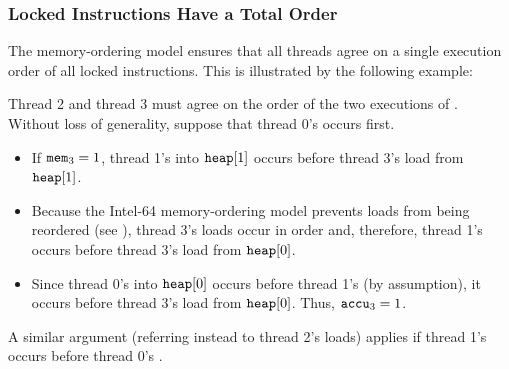 \newpage

\subsubsection*{Locked Instructions Have a Total Order}

The memory-ordering model ensures that all threads agree on a single execution order of all locked instructions.
This is illustrated by the following example:

\begin{table}[!hbt]
\noindent{}
\caption{Locked Instructions Have a Total Order \cite[Example 8-8]{ref:Intel}}
\label{tbl:litmus:intel:8}
\end{table}

\noindent
Thread 2 and thread 3 must agree on the order of the two executions of .
Without loss of generality, suppose that thread 0’s  occurs first.
\begin{itemize}
  \item If $\texttt{mem}_3 = 1$, thread 1’s  into $\texttt{heap}[1]$ occurs before thread 3’s load from $\texttt{heap}[1]$.
  \item Because the Intel-64 memory-ordering model prevents loads from being reordered (see \cite[Section 8.2.3.2]{ref:Intel}), thread 3’s loads occur in order and, therefore, thread 1’s  occurs before thread 3’s load from $\texttt{heap}[0]$.
  \item Since thread 0’s  into $\texttt{heap}[0]$ occurs before thread 1’s  (by assumption), it occurs before thread 3’s load from $\texttt{heap}[0]$.
  Thus, $\texttt{accu}_3 = 1$.
\end{itemize}
A similar argument (referring instead to thread 2’s loads) applies if thread 1’s  occurs before thread 0’s .

